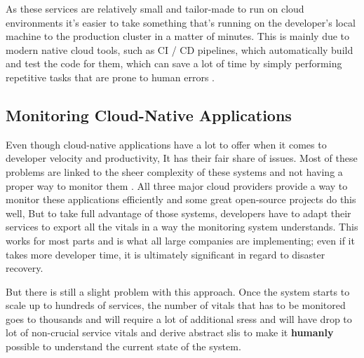 As these services are relatively small and tailor-made to run on cloud environments it's easier to take something that's running on the developer's local machine to the production cluster in a matter of minutes. This is mainly due to modern native cloud tools, such as CI / CD pipelines, which automatically build and test the code for them, which can save a lot of time by simply performing repetitive tasks that are prone to human errors \citep{Whataret68:online}.

\subsection{Monitoring Cloud-Native Applications} \label{monitoring-bg}
Even though cloud-native applications have a lot to offer when it comes to developer velocity and productivity, It has their fair share of issues. Most of these problems are linked to the sheer complexity of these systems and not having a proper way to monitor them \citep{5WaysYou35:online}. All three major cloud providers provide a way to monitor these applications efficiently and some great open-source projects do this well, But to take full advantage of those systems, developers have to adapt their services to export all the vitals in a way the monitoring system understands. This works for most parts and is what all large companies are implementing; even if it takes more developer time, it is ultimately significant in regard to disaster recovery.

But there is still a slight problem with this approach. Once the system starts to scale up to hundreds of services, the number of vitals that has to be monitored goes to thousands and will require a lot of additional \acp{sres} and will have drop to lot of non-crucial service vitals and derive abstract \acp{sli} to make it \textbf{humanly} possible to understand the current state of the system.\\
